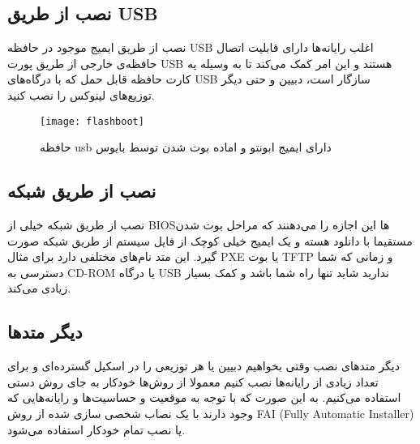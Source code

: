 
\subsection{نصب از طریق USB}
\begin{frame}{نصب از طریق ایمیج موجود در حافظه USB}
  اغلب رایانه‌ها دارای قابلیت اتصال حافظه‌ی خارجی از طریق پورت USB هستند و این امر کمک می‌کند تا به وسیله یه کارت حافظه قابل حمل که با درگاه‌های USB سازگار است، دبیین و حتی دیگر توزیع‌های لینوکس را نصب کنید.
\begin{figure}
  \centering
  \texttt{[image: flashboot]}
  \caption{حافظه usb دارای ایمیج ابونتو و اماده بوت شدن توسط بایوس~\cite{usb_bootable}}
\end{figure}
\end{frame}

\subsection{نصب از طریق شبکه}
\begin{frame}{نصب از طریق شبکه}
  خیلی از BIOS‌ها این اجازه را می‌دهنند که مراحل بوت شدن مستقیما با دانلود هسته و یک ایمیج خیلی کوچک از فایل سیستم‌ از طریق شبکه صورت گیرد.
  این متد نام‌های مختلفی دارد برای مثال PXE یا بوت TFTP و زمانی که شما دسترسی به CD-ROM یا درگاه USB ندارید شاید تنها راه شما باشد و کمک بسیار زیادی می‌کند.\\
\end{frame}

\subsection{دیگر متدها}
\begin{frame}{دیگر متدهای نصب}
  وقتی بخواهیم دبیین یا هر توزیعی را در اسکیل گسترده‌ای و برای تعداد زیادی از رایانه‌ها نصب کنیم  معمولا از روش‌ها خودکار به جای روش دستی استفاده می‌کنیم.
به این صورت که با توجه به موقعیت و حساسیت‌ها و رایانه‌هایی که وجود دارند با یک نصاب شخصی سازی شده از روش FAI (Fully Automatic Installer) یا نصب تمام خودکار استفاده می‌شود.
\end{frame}

